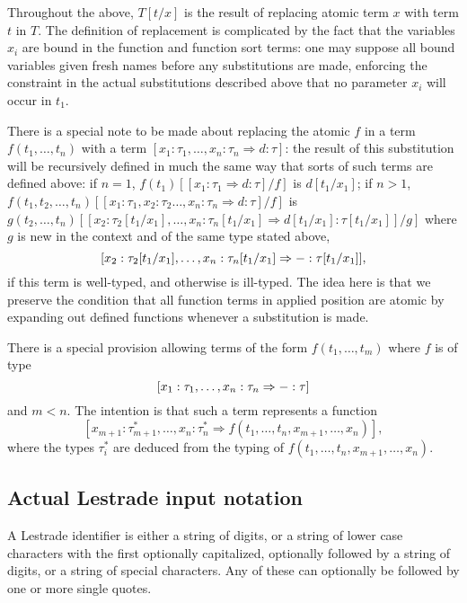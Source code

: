 \documentclass[12pt]{article}
\begin{document}
Throughout the above, $T[t/x]$ is the result of replacing atomic term $x$ with term $t$ in $T$.  The definition of replacement is complicated by the fact that the variables $x_i$ are bound in the function and function sort terms:  one may suppose all bound variables given fresh names before any substitutions are made, enforcing the constraint in the actual substitutions described above that no parameter $x_i$ will occur in $t_1$.

There is a special note to be made about replacing the atomic $f$ in a term $f(t_1,\ldots,t_n)$ with a term 
$[x_1:\tau_1,\ldots,x_n:\tau_n \Rightarrow d:\tau]$:  the result of this substitution will be recursively defined in
much the same way that sorts of such terms are defined above:  if $n=1$, $f(t_1)[[x_1:\tau_1 \Rightarrow d:\tau]/f]$
is $d[t_1/x_1]$;  if $n>1$, $f(t_1,t_2,\ldots,t_n)[[x_1:\tau_1,x_2:\tau_2\ldots, x_n:\tau_n\Rightarrow d:\tau]/f]$
is $g(t_2,\ldots,t_n)[[x_2:\tau_2[t_1/x_1],\ldots, x_n:\tau_n[t_1/x_1]\Rightarrow d[t_1/x_1]:\tau[t_1/x_1]]/g]$  where $g$ is new in the context and of the same type stated above, $$[x_2:\tau_2[t_1/x_1],\ldots,x_n:\tau_n[t_1/x_1]\Rightarrow {\tt -}:\tau[t_1/x_1]],$$ if this term is well-typed, and otherwise is ill-typed.  The idea here is that we preserve the condition that all function terms in applied position are atomic by expanding out defined functions whenever a substitution is made.

There is a special provision allowing terms of the form $f(t_1,\ldots,t_m)$ where $f$ is of type $$[x_1:\tau_1,\ldots,x_n:\tau_n \Rightarrow {\tt -}:\tau]$$ and $m<n$.  The intention is that such a term represents a function
$$[x_{m+1}:\tau^*_{m+1},\ldots,x_n:\tau^*_n \Rightarrow f(t_1,\ldots,t_n,x_{m+1},\ldots,x_n)],$$ where the types
$\tau^*_i$ are deduced from the typing of $f(t_1,\ldots,t_n,x_{m+1},\ldots,x_n)$.

\subsection{Actual Lestrade input notation}

A Lestrade identifier is either a string of digits, or a string of lower case characters with the first optionally capitalized, optionally followed by a string of digits, or a string of special characters.  Any of these can optionally be followed by one or more single quotes.
\end{document}
